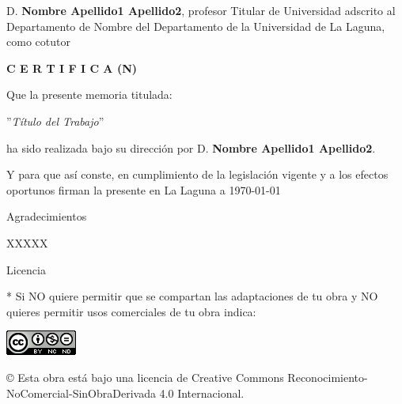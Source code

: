 \documentclass[spanish,a4paper,12pt,oneside]{extreport}
\begin{document}
\bigskip
D. {\bf Nombre Apellido1 Apellido2}, profesor Titular de Universidad adscrito al Departamento de Nombre del Departamento de la Universidad de La Laguna, como cotutor\pagestyle{empty}

\bigskip
\bigskip
{\bf C E R T I F I C A (N)}

\bigskip
\bigskip
Que la presente memoria titulada:

\bigskip
''{\it Título del Trabajo}''

\bigskip
\bigskip
\bigskip

\noindent ha sido realizada bajo su dirección por D. {\bf Nombre Apellido1 Apellido2}.

\bigskip
\bigskip

Y para que así conste, en cumplimiento de la legislación vigente y a los efectos
oportunos firman la presente en La Laguna a \today

\newpage
\thispagestyle{empty}

{ \flushright

\begin{LARGE}
Agradecimientos
\end{LARGE}

\hspace{3mm}

\begin{large}
XXXXX
\end{large}

}
\newpage
\thispagestyle{empty}

\bigskip
\begin{LARGE}
Licencia
\end{LARGE}

\bigskip
* Si NO quiere permitir que se compartan las adaptaciones de tu obra y NO quieres permitir usos comerciales de tu obra indica:

\begin{center}
\includegraphics[scale=1.8]{images/by-nc-nd_88x31}\\[5mm]
\end{center}

\begin{large}
© Esta obra está bajo una licencia de Creative Commons Reconocimiento-NoComercial-SinObraDerivada 4.0 Internacional.
\end{large}
\end{document}
